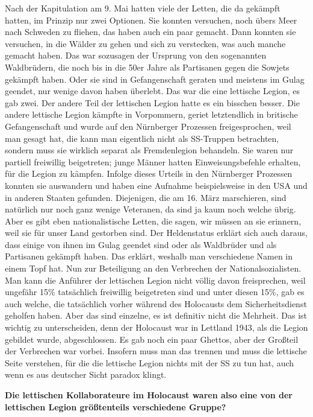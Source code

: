 Nach der Kapitulation am 9. Mai hatten viele der Letten, die da gekämpft hatten, im Prinzip nur zwei Optionen. Sie konnten versuchen, noch übers Meer nach Schweden zu fliehen, das haben auch ein paar gemacht. Dann konnten sie versuchen, in die Wälder zu gehen und sich zu verstecken, was auch manche gemacht haben. Das war sozusagen der Ursprung von den sogenannten Waldbrüdern, die noch bis in die 50er Jahre als Partisanen gegen die Sowjets gekämpft haben. Oder sie sind in Gefangenschaft geraten und meistens im Gulag geendet, nur wenige davon haben überlebt. 
Das war die eine lettische Legion, es gab zwei. Der andere Teil der lettischen Legion hatte es ein bisschen besser. Die andere lettische Legion kämpfte in Vorpommern, geriet letztendlich in britische Gefangenschaft und wurde auf den Nürnberger Prozessen freigesprochen, weil man gesagt hat, die kann man eigentlich nicht als SS-Truppen betrachten, sondern muss sie wirklich separat als Fremdenlegion behandeln. Sie waren nur partiell freiwillig beigetreten; junge Männer hatten Einweisungsbefehle erhalten, für die Legion zu kämpfen. Infolge dieses Urteils in den Nürnberger Prozessen konnten sie auswandern und haben eine Aufnahme beispielsweise in den USA und in anderen Staaten gefunden. 
Diejenigen, die am 16. März marschieren, sind natürlich nur noch ganz wenige Veteranen, da sind ja kaum noch welche übrig. Aber es gibt eben nationalistische Letten, die sagen, wir müssen an sie erinnern, weil sie für unser Land gestorben sind. Der Heldenstatus erklärt sich auch daraus, dass einige von ihnen im Gulag geendet sind oder als Waldbrüder und als Partisanen gekämpft haben. Das erklärt, weshalb man verschiedene Namen in einem Topf hat. 
Nun zur Beteiligung an den Verbrechen der Nationalsozialisten. Man kann die Anführer der lettischen Legion nicht völlig davon freisprechen, weil ungefähr 15\% tatsächlich freiwillig beigetreten sind und unter diesen 15\%, gab es auch welche, die tatsächlich vorher während des Holocausts dem Sicherheitsdienst geholfen haben. Aber das sind einzelne, es ist definitiv nicht die Mehrheit. Das ist wichtig zu unterscheiden, denn der Holocaust war in Lettland 1943, als die Legion gebildet wurde, abgeschlossen. Es gab noch ein paar Ghettos, aber der Großteil der Verbrechen war vorbei. Insofern muss man das trennen und muss die lettische Seite verstehen, für die die lettische Legion nichts mit der SS zu tun hat, auch wenn es aus deutscher Sicht paradox klingt. 

\textbf{Die lettischen Kollaborateure im Holocaust waren also eine von der lettischen Legion größtenteils verschiedene Gruppe?} 

